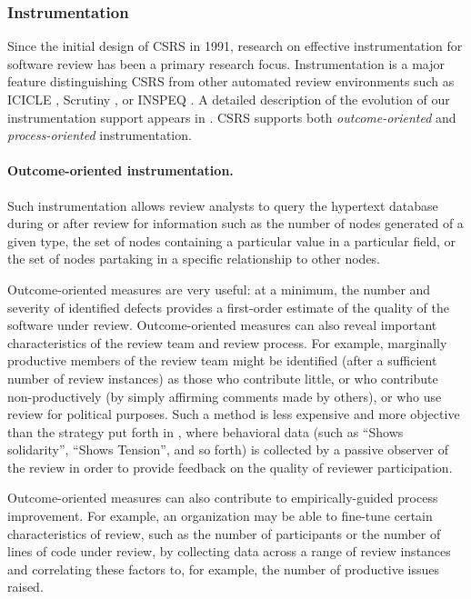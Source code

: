 \subsubsection{Instrumentation}
\label{sec:instrumentation}

Since the initial design of CSRS in 1991, research on effective
instrumentation for software review has been a primary research focus.
Instrumentation is a major feature distinguishing CSRS from other automated
review environments such as ICICLE \cite{Brothers90,Sembugamoorthy90},
Scrutiny \cite{Gintell93}, or INSPEQ \cite{Knight91}.  A detailed
description of the evolution of our instrumentation support
appears in \cite{csdl-93-07}.  CSRS supports both {\em outcome-oriented}
and {\em process-oriented} instrumentation.

\paragraph{Outcome-oriented instrumentation.} Such instrumentation allows review analysts
to query the hypertext database during or after review for information such
as the number of nodes generated of a given type, the set of nodes
containing a particular value in a particular field, or the set of nodes
partaking in a specific relationship to other nodes.

Outcome-oriented measures are very useful: at a minimum, the number and
severity of identified defects provides a first-order estimate of the
quality of the software under review.  Outcome-oriented measures can also
reveal important characteristics of the review team and review process.
For example, marginally productive members of the review team might be
identified (after a sufficient number of review instances) as those who
contribute little, or who contribute non-productively (by simply affirming
comments made by others), or who use review for political purposes.  Such a
method is less expensive and more objective than the strategy put forth in
\cite{Freedman90}, where behavioral data (such as ``Shows solidarity'',
``Shows Tension'', and so forth) is collected by a passive observer of the
review in order to provide feedback on the quality of reviewer
participation.

Outcome-oriented measures can also contribute to empirically-guided process
improvement.  For example, an organization may be able to fine-tune certain
characteristics of review, such as the number of participants or the number
of lines of code under review, by collecting data across a range of review
instances and correlating these factors to, for example, the number of
productive issues raised.

